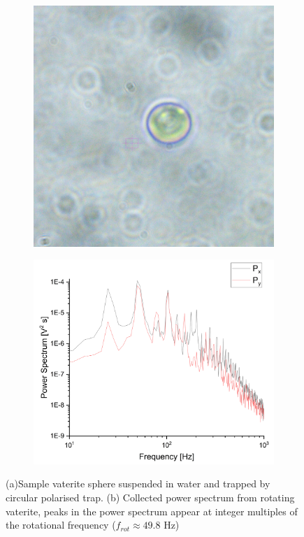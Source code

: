\begin{figure}
	\centering
	\begin{subfigure}{0.4\linewidth}
		\includegraphics[width=\linewidth]{vaterite_sample.jpg}
		\subcaption{}
	\end{subfigure}
	\begin{subfigure}{0.55\linewidth}
		\includegraphics[width=\linewidth]{rotating_psd.png}
		\subcaption{}
	\end{subfigure}
	\caption{(a)Sample vaterite sphere suspended in water and trapped by circular polarised trap. (b) Collected power spectrum from rotating vaterite, peaks in the power spectrum appear at integer multiples of the rotational frequency ($f_{rot} \approx 49.8$ Hz)}
\end{figure}

